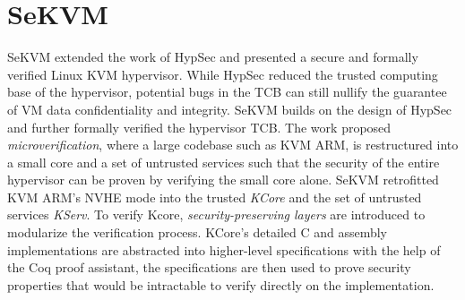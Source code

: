 \section{SeKVM}
\label{sec:sekvmintro}

SeKVM \cite{sekvm} extended the work of HypSec and presented a secure and formally verified
Linux KVM hypervisor. While HypSec reduced the trusted computing base of the
hypervisor, potential bugs in the TCB can still nullify the guarantee of VM
data confidentiality and integrity. SeKVM builds on the design of HypSec and
further formally verified the hypervisor TCB. The work proposed
\textit{microverification},
where a large codebase such as KVM ARM, is restructured into a small core and a
set of untrusted services such that the security of the entire hypervisor can
be proven by verifying the small core alone. SeKVM retrofitted KVM ARM's NVHE
mode into the trusted \textit{KCore} and the set of untrusted services
\textit{KServ}.
To verify Kcore, \textit{security-preserving layers} are introduced to
modularize the verification process.
KCore's detailed C and assembly implementations are abstracted into higher-level
specifications with the help of the Coq proof assistant, the specifications are
then used to prove security properties that would be intractable to verify
directly on the implementation.





